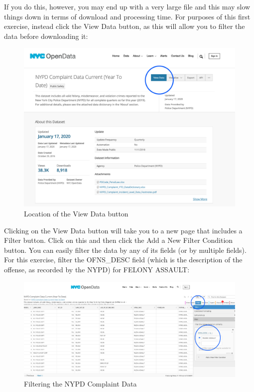 \documentclass[]{book}
\begin{document}
If you do this, however, you may end up with a very large file and this may slow things down in terms of download and processing time. For purposes of this first exercise, instead click the View Data button, as this will allow you to filter the data before downloading it:

\begin{figure}
\centering
\includegraphics{images/NYPD_CD_view.png}
\caption{Location of the View Data button}
\end{figure}

Clicking on the View Data button will take you to a new page that includes a Filter button. Click on this and then click the Add a New Filter Condition button. You can easily filter the data by any of its fields (or by multiple fields). For this exercise, filter the OFNS\_DESC field (which is the description of the offense, as recorded by the NYPD) for FELONY ASSAULT:

\begin{figure}
\centering
\includegraphics{images/NYPD_CD_filter.png}
\caption{Filtering the NYPD Complaint Data}
\end{figure}
\end{document}
